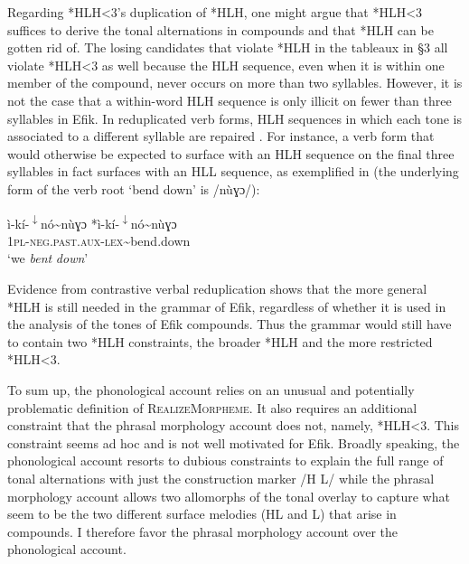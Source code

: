 \documentclass[output=paper]{langscibook}
\begin{document}
Regarding *HLH<3’s duplication of *HLH, one might argue that *HLH<3 suffices to derive the tonal alternations in compounds and that *HLH can be gotten rid of. The losing candidates that violate *HLH in the tableaux in §3 all violate *HLH<3 as well because the HLH sequence, even when it is within one member of the compound, never occurs on more than two syllables. However, it is not the case that a within-word HLH sequence is only illicit on fewer than three syllables in Efik. In reduplicated verb forms, HLH sequences in which each tone is associated to a different syllable are repaired \citep{Glewwe2017}. For instance, a verb form that would otherwise be expected to surface with an HLH sequence on the final three syllables in fact surfaces with an HLL sequence, as exemplified in  (the underlying form of the verb root ‘bend down’ is /nùɣɔ/):

\ea\label{ex:glewwe:9} 
\gll ì-kí-\textsuperscript{$\downarrow$}nó{\textasciitilde}nùɣɔ        *ì-kí-\textsuperscript{$\downarrow$}nó{\textasciitilde}nùɣɔ\\
     \textsc{1pl-neg.past.aux-lex{\textasciitilde}}\textup{bend.down}\\
\glt ‘we \textit{bent} \textit{down}’
\z

Evidence from contrastive verbal reduplication shows that the more general *HLH is still needed in the grammar of Efik, regardless of whether it is used in the analysis of the tones of Efik compounds. Thus the grammar would still have to contain two *HLH constraints, the broader *HLH and the more restricted *HLH<3.

To sum up, the phonological account relies on an unusual and potentially problematic definition of \textsc{RealizeMorpheme}. It also requires an additional constraint that the phrasal morphology account does not, namely, *HLH<3. This constraint seems ad hoc and is not well motivated for Efik. Broadly speaking, the phonological account resorts to dubious constraints to explain the full range of tonal alternations with just the construction marker /H L/ while the phrasal morphology account allows two allomorphs of the tonal overlay to capture what seem to be the two different surface melodies (HL and L) that arise in compounds. I therefore favor the phrasal morphology account over the phonological account. 
\end{document}
